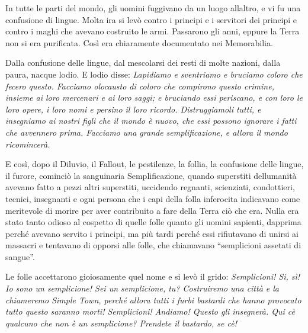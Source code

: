 In tutte le parti del mondo, gli uomini fuggivano da un luogo
all\textquotesingle altro, e vi fu una confusione di lingue. Molta ira
si levò contro i principi e i servitori dei principi e contro i maghi
che avevano costruito le armi. Passarono gli anni, eppure la Terra non
si era purificata. Così era chiaramente documentato nei Memorabilia.

Dalla confusione delle lingue, dal mescolarsi dei resti di molte
nazioni, dalla paura, nacque l\textquotesingle odio. E
l\textquotesingle odio disse: \emph{Lapidiamo e sventriamo e bruciamo
	coloro che fecero questo. Facciamo olocausto di coloro che compirono
	questo crimine, insieme ai loro mercenari e ai loro saggi; e bruciando
	essi periscano, e con loro le loro opere, i loro nomi e persino il loro
	ricordo. Distruggiamoli tutti, e insegniamo ai nostri figli che il mondo
	è nuovo, che essi possono ignorare i fatti che avvennero prima. Facciamo
	una grande semplificazione, e allora il mondo ricomincerà.}

E così, dopo il Diluvio, il Fallout, le pestilenze, la follia, la
confusione delle lingue, il furore, cominciò la sanguinaria
Semplificazione, quando superstiti dell\textquotesingle umanità avevano
fatto a pezzi altri superstiti, uccidendo regnanti, scienziati,
condottieri, tecnici, insegnanti e ogni persona che i capi della folla
inferocita indicavano come meritevole di morire per aver contribuito a
fare della Terra ciò che era. Nulla era stato tanto odioso al cospetto
di quelle folle quanto gli uomini sapienti, dapprima perché avevano
servito i principi, ma più tardi perché essi rifiutavano di unirsi ai
massacri e tentavano di opporsi alle folle, che chiamavano ``semplicioni
assetati di sangue''.

Le folle accettarono gioiosamente quel nome e si levò il grido:
\emph{Semplicioni! Si, sì! Io sono un semplicione! Sei un semplicione,
	tu? Costruiremo una città e la chiameremo Simple Town, perché allora
	tutti i furbi bastardi che hanno provocato tutto questo saranno morti!
	Semplicioni! Andiamo! Questo gli insegnerà. Qui c\textquotesingle è
	qualcuno che non è un semplicione? Prendete il bastardo, se
	c\textquotesingle è!}

